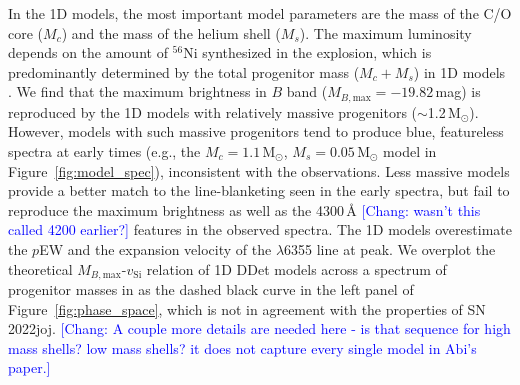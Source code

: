 \documentclass[twocolumn]{aastex631}
\newcommand{\sn}{SN\,2022joj}
\newcommand{\chang}[1]{\textcolor{blue}{[Chang: #1]}}
\begin{document}
\begin{CJK*}{UTF8}{gbsn}
In the 1D models, the most important model parameters are the mass of the C/O core ($M_c$) and the mass of the helium shell ($M_s$). The maximum luminosity depends on the amount of $^{56}$Ni synthesized in the explosion, which is predominantly determined by the total progenitor mass ($M_c+M_s$) in 1D models \citep{polin_observational_2019}. We find that the maximum brightness in $B$ band ($M_{B,\mathrm{max}}=-19.82$\,mag) is reproduced by the 1D models with relatively massive progenitors ($\sim$1.2\,$\mathrm{M_\odot}$). However, models with such massive progenitors tend to produce blue, featureless spectra at early times (e.g., the $M_c=1.1\,\mathrm{M_\odot}$, $M_s=0.05\,\mathrm{M_\odot}$ model in Figure~\ref{fig:model_spec}), inconsistent with the observations. Less massive models provide a better match to the line-blanketing seen in the early spectra, but fail to reproduce the maximum brightness as well as the 4300\,\r{A} \chang{wasn't this called 4200 earlier?} features in the observed spectra. The 1D models overestimate the $p$EW and the expansion velocity of the  $\lambda$6355 line at peak. We overplot the theoretical $M_{B,\mathrm{max}}$-$v_\mathrm{Si}$ relation of 1D DDet models across a spectrum of progenitor masses in \citet{polin_observational_2019} as the dashed black curve in the left panel of Figure~\ref{fig:phase_space}, which is not in agreement with the properties of \sn. \chang{A couple more details are needed here - is that sequence for high mass shells? low mass shells? it does not capture every single model in Abi's paper.}


\end{CJK*}
\end{document}
